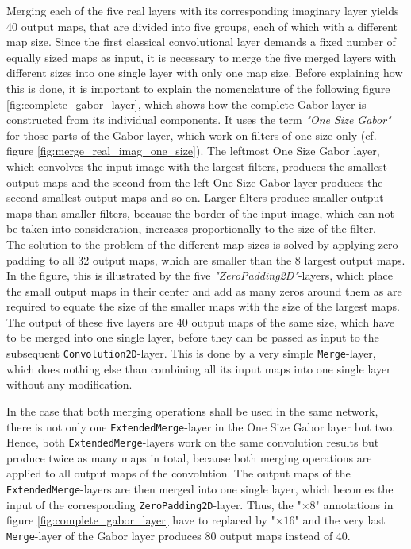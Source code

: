 \documentclass[11pt, a4paper]{article}
\newcommand\q[1]{\emph{"#1"}}
\begin{document}
\begin{appendix}
Merging each of the five real layers with its corresponding imaginary layer yields 40 output maps, that are divided into five groups, each of which with a different map size. Since the first classical convolutional layer demands a fixed number of equally sized maps as input, it is necessary to merge the five merged layers with different sizes into one single layer with only one map size. Before explaining how this is done, it is important to explain the nomenclature of the following figure \ref{fig:complete_gabor_layer}, which shows how the complete Gabor layer is constructed from its individual components. It uses the term \q{One Size Gabor} for those parts of the Gabor layer, which work on filters of one size only (cf. figure \ref{fig:merge_real_imag_one_size}). The leftmost One Size Gabor layer, which convolves the input image with the largest filters, produces the smallest output maps and the second from the left One Size Gabor layer produces the second smallest output maps and so on. Larger filters produce smaller output maps than smaller filters, because the border of the input image, which can not be taken into consideration, increases proportionally to the size of the filter.\\
The solution to the problem of the different map sizes is solved by applying zero-padding to all 32 output maps, which are smaller than the 8 largest output maps. In the figure, this is illustrated by the five \q{ZeroPadding2D}-layers, which place the small output maps in their center and add as many zeros around them as are required to equate the size of the smaller maps with the size of the largest maps. The output of these five layers are 40 output maps of the same size, which have to be merged into one single layer, before they can be passed as input to the subsequent \texttt{Convolution2D}-layer. This is done by a very simple \texttt{Merge}-layer, which does nothing else than combining all its input maps into one single layer without any modification.


In the case that both merging operations shall be used in the same network, there is not only one \texttt{ExtendedMerge}-layer in the One Size Gabor layer but two. Hence, both \texttt{ExtendedMerge}-layers work on the same convolution results but produce twice as many maps in total, because both merging operations are applied to all output maps of the convolution. The output maps of the \texttt{ExtendedMerge}-layers are then merged into one single layer, which becomes the input of the corresponding \texttt{ZeroPadding2D}-layer. Thus, the "$\times 8$" annotations in figure \ref{fig:complete_gabor_layer} have to replaced by "$\times 16$" and the very last \texttt{Merge}-layer of the Gabor layer produces 80 output maps instead of 40.
\end{appendix}
\end{document}
